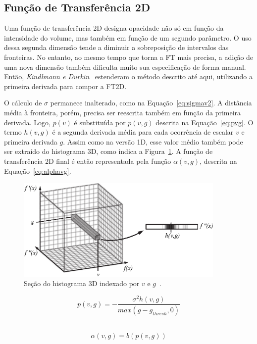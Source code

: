 \clearpage
\subsection{Função de Transferência 2D}
\label{subsec:gordon.2d}
	Uma função de transferência 2D designa opacidade não só em função da intensidade do volume, mas também em função de um segundo parâmetro. O uso dessa segunda dimensão tende a diminuir a sobreposição de intervalos das fronteiras. No entanto, ao mesmo tempo que torna a FT mais precisa, a adição de uma nova dimensão também dificulta muito sua especificação de forma manual. Então, 
	\textit{Kindlmann e Durkin}~\cite{gordon} estenderam o método descrito até aqui, utilizando a primeira derivada para compor a FT2D.
	
	O cálculo de $\sigma$ permanece inalterado, como na Equação~\eqref{eq:sigmav2}. A distância média à fronteira, porém, precisa ser reescrita também em função da primeira derivada. Logo, $p(v)$ é substituída por $p(v,g)$ descrita na Equação~\eqref{eq:pvg}. O termo $h(v,g)$ é a segunda derivada média para cada ocorrência de escalar $v$ e primeira derivada $g$. Assim como na versão 1D, esse valor médio também pode ser extraído do histograma 3D, como indica a Figura~\ref{fig:g_hvg}. A função de transferência 2D final é então representada pela função $ \alpha(v, g) $, descrita na Equação~\eqref{eq:alphavg}.
    
\begin{figure}[h]
	\centering
	\includegraphics[width=0.9\textwidth]{images/g_hvg}
	\caption{Seção do histograma 3D indexado por $ v $ e $ g $~\cite{gordonms}.}
	\label{fig:g_hvg}
\end{figure}
    
\begin{equation} \label{eq:pvg}
	p(v,g) = -\frac{\sigma^{2}h(v,g)}{max(g - g_{thresh}, 0)}
\end{equation} \

\begin{equation} \label{eq:alphavg}
	\alpha(v, g) = b(p(v, g))
\end{equation} \


